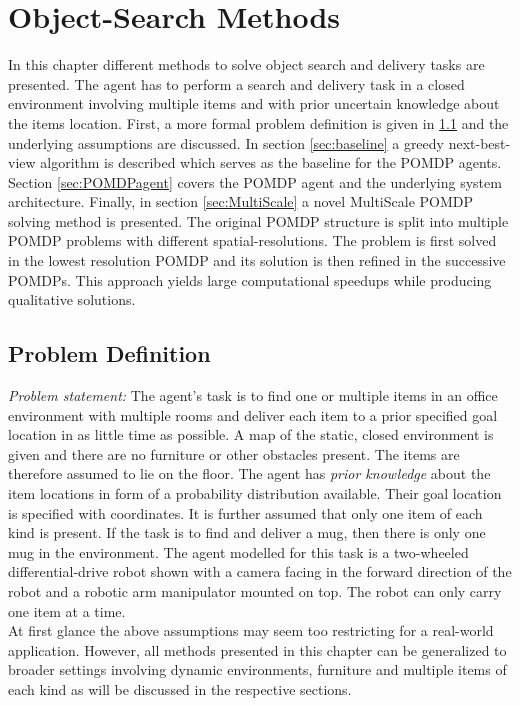 \chapter{Object-Search Methods}
\label{sec:object_search}
In this chapter different methods to solve object search and delivery tasks are presented. The agent has to perform a search and delivery task in a closed environment involving multiple items and with prior uncertain knowledge about the items location. First, a more formal problem definition is given in \ref{sec:problemdef} and the underlying assumptions are discussed. In section \ref{sec:baseline} a greedy next-best-view algorithm is described which serves as the baseline for the POMDP agents. Section \ref{sec:POMDPagent} covers the POMDP agent and the underlying system architecture. Finally, in section \ref{sec:MultiScale} a novel MultiScale POMDP solving method is presented. The original POMDP structure is split into multiple POMDP problems with different spatial-resolutions. The problem is first solved in the lowest resolution POMDP and its solution is then refined in the successive POMDPs. This approach yields large computational speedups while producing qualitative solutions.  

\section{Problem Definition}\label{sec:problemdef}
\textit{Problem statement:} 
The agent's task is to find one or multiple items in an office environment with multiple rooms and deliver each item to a prior specified goal location in as little time as possible. A map of the static, closed environment is given and there are no furniture or other obstacles present. The items are therefore assumed to lie on the floor. The agent has \textit{prior knowledge} about the item locations in form of a probability distribution available. Their goal location is specified with coordinates. It is further assumed that only one item of each kind is present. If the task is to find and deliver a mug, then there is only one mug in the environment. The agent modelled for this task is a two-wheeled differential-drive robot shown with a camera facing in the forward direction of the robot and a robotic arm manipulator mounted on top. The robot can only carry one item at a time.\\

At first glance the above assumptions may seem too restricting for a real-world application. However, all methods presented in this chapter can be generalized to broader settings involving dynamic environments, furniture and multiple items of each kind as will be discussed in the respective sections.

